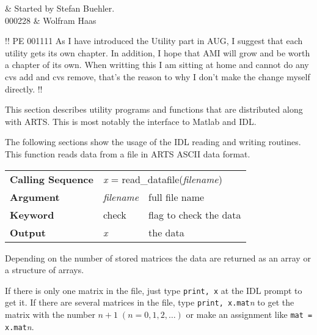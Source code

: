 %
%
 \label{sec:utilities}

%
%
 & Started by Stefan Buehler.\\
  000228 & Wolfram Haas
\stophistory


!! PE 001111 As I have introduced the Utility part in AUG, I suggest that each
utility gets its own chapter. In addition, I hope that AMI will grow and be worth a chapter of its own. When writting this I am sitting at home and cannot do
any cvs add and cvs remove, that's the reason to why I don't make the change myself directly. !!

This section describes utility programs and functions that are
distributed along with ARTS. This is most notably the interface to
Matlab and IDL.


\label{sec:utilities:aii}

The following sections show the usage of the IDL reading and writing
routines.
This function reads data from a file in ARTS ASCII data format.
\begin{center}
\begin{tabular}{|l|ll|}
  \hline
  \textbf{Calling Sequence} &
  \multicolumn{2}{l|}{\textit{x} = %
  {\ttfamily read\_datafile(\textnormal{\textit{filename}})}}     \\ 
  \textbf{Argument} & \textit{filename} & full file name          \\
  \textbf{Keyword}  & check             & flag to check the data  \\
  \textbf{Output}   & \textit{x}        & the data                \\
  \hline
\end{tabular}
\end{center}
Depending on the number of stored matrices the data are returned as an
array or a structure of arrays.

If there is only one matrix in the file, just type \hspace{1ex}
\texttt{print, x} \hspace{1ex} at the IDL prompt to get it. If there
are several matrices in the file, type \hspace{1ex} \texttt{print, 
x.mat}\textit{n} \hspace{1ex} to get the matrix with the number $n +
1\;( n = 0, 1, 2, \ldots)$ or make an assignment like \hspace{1ex}
\texttt{mat = x.mat}\textit{n}.

